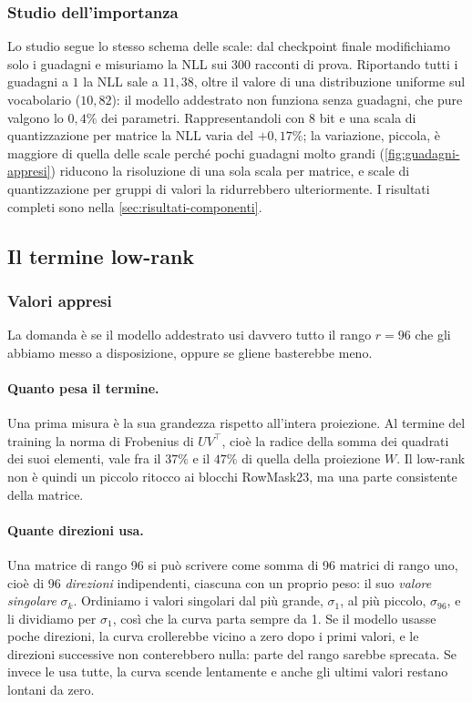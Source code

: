 \subsubsection{Studio dell'importanza}
\label{sec:studio-guadagni}
Lo studio segue lo stesso schema delle scale: dal checkpoint finale modifichiamo solo i guadagni e misuriamo la NLL sui 300 racconti di prova. Riportando tutti i guadagni a $1$ la NLL sale a $11{,}38$, oltre il valore di una distribuzione uniforme sul vocabolario ($10{,}82$): il modello addestrato non funziona senza guadagni, che pure valgono lo $0{,}4\%$ dei parametri. Rappresentandoli con 8 bit e una scala di quantizzazione per matrice la NLL varia del $+0{,}17\%$; la variazione, piccola, è maggiore di quella delle scale perché pochi guadagni molto grandi (\autoref{fig:guadagni-appresi}) riducono la risoluzione di una sola scala per matrice, e scale di quantizzazione per gruppi di valori la ridurrebbero ulteriormente. I risultati completi sono nella \autoref{sec:risultati-componenti}.


\subsection{Il termine low-rank}

\subsubsection{Valori appresi}
La domanda è se il modello addestrato usi davvero tutto il rango $r=96$ che gli abbiamo messo a disposizione, oppure se gliene basterebbe meno.

\paragraph{Quanto pesa il termine.} Una prima misura è la sua grandezza rispetto all'intera proiezione. Al termine del training la norma di Frobenius di $UV^\top$, cioè la radice della somma dei quadrati dei suoi elementi, vale fra il $37\%$ e il $47\%$ di quella della proiezione $W$. Il low-rank non è quindi un piccolo ritocco ai blocchi RowMask23, ma una parte consistente della matrice.

\paragraph{Quante direzioni usa.} Una matrice di rango 96 si può scrivere come somma di 96 matrici di rango uno, cioè di 96 \emph{direzioni} indipendenti, ciascuna con un proprio peso: il suo \emph{valore singolare} $\sigma_k$. Ordiniamo i valori singolari dal più grande, $\sigma_1$, al più piccolo, $\sigma_{96}$, e li dividiamo per $\sigma_1$, così che la curva parta sempre da 1. Se il modello usasse poche direzioni, la curva crollerebbe vicino a zero dopo i primi valori, e le direzioni successive non conterebbero nulla: parte del rango sarebbe sprecata. Se invece le usa tutte, la curva scende lentamente e anche gli ultimi valori restano lontani da zero.


